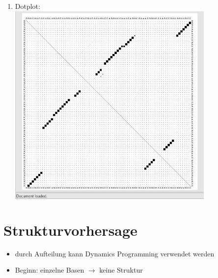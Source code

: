 \begin{enumerate}
	\item Dotplot:\\
	\includegraphics[width=0.8\textwidth]{lectures/160404/pix/Dotplot.jpg}
\end{enumerate}

\section{Strukturvorhersage}
\begin{itemize}
	\item durch Aufteilung kann Dynamics Programming verwendet werden
	\item Beginn: einzelne Basen $\rightarrow$ keine Struktur
\end{itemize}

